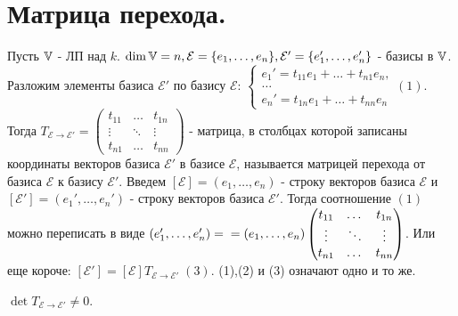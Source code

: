 \documentclass[../main.tex]{subfiles}
\begin{document}
\newpage
{}
\section{Матрица перехода.}
Пусть $\mathbb{V}$ - ЛП над $k$. $\dim \mathbb{V} = n, \mathcal{E}=\{e_{1},\dots,e_{n}\}, \mathcal{E'}=\{e_{1}',\dots,e_{n}'\}$ - базисы в $\mathbb{V}$. 
\\Разложим элементы базиса $\mathcal{E'}$ по базису $\mathcal{E}$: $\begin{cases}e_{1}'=t_{11}e_{1}+\dots+t_{n1}e_{n},\\\dots\\e_{n}'=t_{1n}e_{1}+\dots+t_{nn}e_{n} \end{cases}(1)$.  Тогда $T_{\mathcal{E}\to\mathcal{E'} }= \begin{pmatrix}
    t_{11} & \dots & t_{1n}\\
    \vdots & \ddots & \vdots\\
    t_{n1} & \dots & t_{nn}
\end{pmatrix}$ - матрица, в столбцах которой записаны координаты векторов базиса $\mathcal{E'}$ в базисе $\mathcal{E}$, называется матрицей перехода от базиса $\mathcal{E}$ к базису $\mathcal{E'}$. Введем $[\mathcal{E}]=(e_{1},\dots,e_{n})$ - строку векторов базиса $\mathcal{E}$ и $[\mathcal{E'}]=(e_{1}',\dots,e_{n}')$ - строку векторов базиса $\mathcal{E'}$. Тогда соотношение $(1)$ можно переписать в виде $(e_{1}',\dots,e_{n}')=\\= (e_{1},\dots,e_{n})\begin{pmatrix}
    t_{11} & \dots & t_{1n}\\
    \vdots & \ddots & \vdots\\
    t_{n1} & \dots & t_{nn}
\end{pmatrix}$. Или еще короче: $[\mathcal{E'}]=[\mathcal{E}]T_{\mathcal{E}\to\mathcal{E'}}\;(3)$. (1),(2) и (3) означают одно и то же.

\begin{theorem}
    $\det T_{\mathcal{E}\to\mathcal{E'}}\neq 0$.
\end{theorem}
\end{document}
